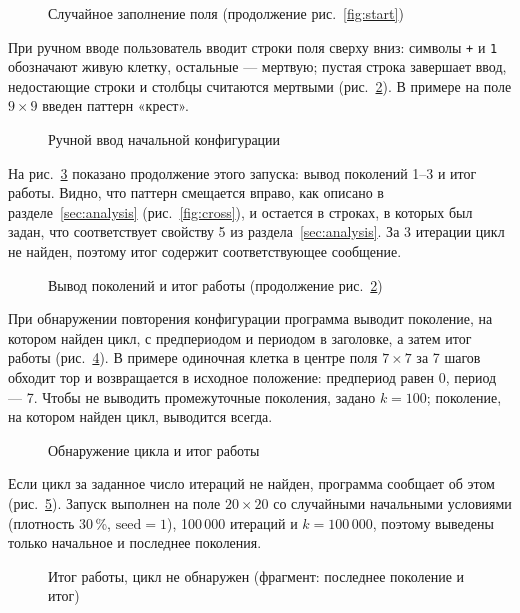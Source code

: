\begin{figure}[H]
	\centering
	\caption{Случайное заполнение поля (продолжение рис.~\ref{fig:start})}
	\label{fig:randinit}
\end{figure}

При ручном вводе пользователь вводит строки поля сверху вниз: символы \texttt{+} и \texttt{1} обозначают живую клетку, остальные --- мертвую; пустая строка завершает ввод, недостающие строки и столбцы считаются мертвыми (рис.~\ref{fig:manual}). В примере на поле $9 \times 9$ введен паттерн «крест».

\begin{figure}[H]
	\centering
	\caption{Ручной ввод начальной конфигурации}
	\label{fig:manual}
\end{figure}

На рис.~\ref{fig:run} показано продолжение этого запуска: вывод поколений 1--3 и итог работы. Видно, что паттерн смещается вправо, как описано в разделе~\ref{sec:analysis} (рис.~\ref{fig:cross}), и остается в строках, в которых был задан, что соответствует свойству 5 из раздела~\ref{sec:analysis}. За 3 итерации цикл не найден, поэтому итог содержит соответствующее сообщение.

\begin{figure}[H]
	\centering
	\caption{Вывод поколений и итог работы (продолжение рис.~\ref{fig:manual})}
	\label{fig:run}
\end{figure}

При обнаружении повторения конфигурации программа выводит поколение, на котором найден цикл, с предпериодом и периодом в заголовке, а затем итог работы (рис.~\ref{fig:cycle}). В примере одиночная клетка в центре поля $7 \times 7$ за 7 шагов обходит тор и возвращается в исходное положение: предпериод равен 0, период --- 7. Чтобы не выводить промежуточные поколения, задано $k = 100$; поколение, на котором найден цикл, выводится всегда.

\begin{figure}[H]
	\centering
	\caption{Обнаружение цикла и итог работы}
	\label{fig:cycle}
\end{figure}

Если цикл за заданное число итераций не найден, программа сообщает об этом (рис.~\ref{fig:nocycle}). Запуск выполнен на поле $20 \times 20$ со случайными начальными условиями (плотность 30\,\%, $\text{seed} = 1$), 100\,000 итераций и $k = 100\,000$, поэтому выведены только начальное и последнее поколения.

\begin{figure}[H]
	\centering
	\caption{Итог работы, цикл не обнаружен (фрагмент: последнее поколение и итог)}
	\label{fig:nocycle}
\end{figure}
